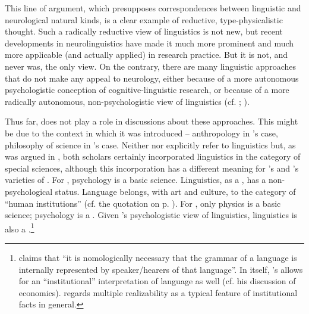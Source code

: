 \documentclass[output=paper]{langscibook}
\begin{document}
This line of argument, which presupposes correspondences between linguistic and neurological natural kinds, is a clear example of reductive, type-physicalistic thought. Such a radically reductive view of linguistics is not new, but recent developments in neurolinguistics have made it much more prominent and much more applicable (and actually applied) in research practice. But it is not, and never was, the only view. On the contrary, there are many linguistic approaches that do not make any appeal to neurology, either because of a more autonomous psychologistic conception of cognitive-linguistic research, or because of a more radically autonomous, non-psychologistic view of linguistics (cf. \citealt{Botha1992}; \citealt{Elffers2014}).

Thus far,  does not play a role in discussions about these approaches. This might be due to the context in which it was introduced -- anthropology in {\Sapir}'s case, philosophy of science in {\Fodor}'s case. Neither \citet{Sapir1917} nor \citet{Fodor1974} explicitly refer to linguistics but, as was argued in , both scholars certainly incorporated linguistics in the category of special sciences, although this incorporation has a different meaning for {\Sapir}'s and {\Fodor}'s varieties of . For {\Sapir}, psychology is a basic science. Linguistics, as a , has a non-psychological status. Language belongs, with art and culture, to the category of ``human institutions'' (cf. the quotation on p. \pageref{q:elffers:huminst}). For {\Fodor}, only physics is a basic science; psychology is a . Given {\Fodor}'s psychologistic view of linguistics, linguistics is also a .\footnote{\citet[149]{Fodor1985} claims that ``it is nomologically necessary that the grammar of a language is internally represented by speaker/hearers of that language''. In itself, {\Fodor}'s  allows for an ``institutional'' interpretation of language as well (cf. his discussion of economics). \citet[422--423]{Jones2004} regards multiple realizability as a typical feature of institutional facts in general.\label{fn:elffers:nomologically}}
\end{document}
